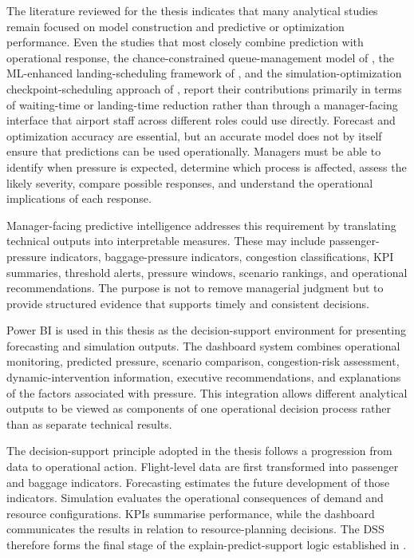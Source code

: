 The literature reviewed for the thesis indicates that many analytical studies remain focused on model construction and predictive or optimization performance. Even the studies that most closely combine prediction with operational response, the chance-constrained queue-management model of \textcite{cao2025robust}, the ML-enhanced landing-scheduling framework of \textcite{pang2024machine}, and the simulation-optimization checkpoint-scheduling approach of \textcite{sang2026integrating}, report their contributions primarily in terms of waiting-time or landing-time reduction rather than through a manager-facing interface that airport staff across different roles could use directly. Forecast and optimization accuracy are essential, but an accurate model does not by itself ensure that predictions can be used operationally. Managers must be able to identify when pressure is expected, determine which process is affected, assess the likely severity, compare possible responses, and understand the operational implications of each response.

Manager-facing predictive intelligence addresses this requirement by translating technical outputs into interpretable measures. These may include passenger-pressure indicators, baggage-pressure indicators, congestion classifications, KPI summaries, threshold alerts, pressure windows, scenario rankings, and operational recommendations. The purpose is not to remove managerial judgment but to provide structured evidence that supports timely and consistent decisions.

Power BI is used in this thesis as the decision-support environment for presenting forecasting and simulation outputs. The dashboard system combines operational monitoring, predicted pressure, scenario comparison, congestion-risk assessment, dynamic-intervention information, executive recommendations, and explanations of the factors associated with pressure. This integration allows different analytical outputs to be viewed as components of one operational decision process rather than as separate technical results.

The decision-support principle adopted in the thesis follows a progression from data to operational action. Flight-level data are first transformed into passenger and baggage indicators. Forecasting estimates the future development of those indicators. Simulation evaluates the operational consequences of demand and resource configurations. KPIs summarise performance, while the dashboard communicates the results in relation to resource-planning decisions. The DSS therefore forms the final stage of the explain-predict-support logic established in .

